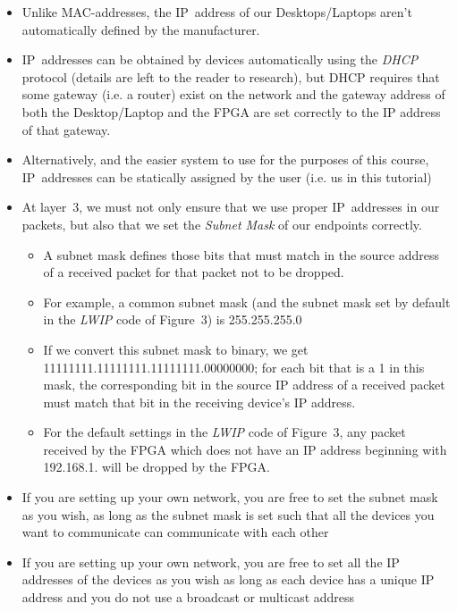 \documentclass[11pt]{article}
\begin{document}
\begin{itemize}
    \begin{itemize}
        \item Unlike MAC-addresses, the IP~address of our Desktops/Laptops aren't automatically defined by the manufacturer.
        \item IP~addresses can be obtained by devices automatically using the \textit{DHCP} protocol (details are left to the reader to research), but DHCP requires that some gateway (i.e. a router) exist on the network and the gateway address of both the Desktop/Laptop and the FPGA are set correctly to the IP address of that gateway.
        \item Alternatively, and the easier system to use for the purposes of this course, IP~addresses can be statically assigned by the user (i.e. us in this tutorial)
        \item At layer~3, we must not only ensure that we use proper IP~addresses in our packets, but also that we set the \textit{Subnet Mask} of our endpoints correctly. 
        \begin{itemize}
            \item A subnet mask defines those bits that must match in the source address of a received packet for that packet not to be dropped.
            \item For example, a common subnet mask (and the subnet mask set by default in the \textit{LWIP} code of Figure~3) is 255.255.255.0
            \item If we convert this subnet mask to binary, we get 11111111.11111111.11111111.00000000; for each bit that is a 1 in this mask, the corresponding bit in the source IP address of a received packet must match that bit in the receiving device's IP address.
            \item For the default settings in the \textit{LWIP} code of Figure~3, any packet received by the FPGA which does not have an IP address beginning with 192.168.1. will be dropped by the FPGA.
        \end{itemize}
        \item If you are setting up your own network, you are free to set the subnet mask as you wish, as long as the subnet mask is set such that all the devices you want to communicate can communicate with each other
        \item If you are setting up your own network, you are free to set all the IP addresses of the devices as you wish as long as each device has a unique IP address and you do not use a broadcast or multicast address
        \begin{itemize}

\end{itemize}
\end{itemize}
\end{itemize}
\end{document}
